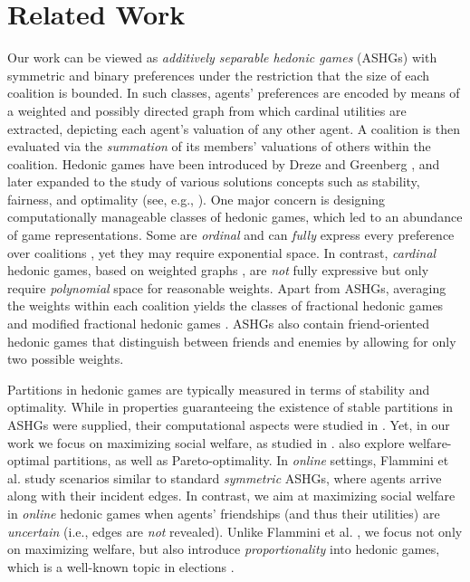 \documentclass[letterpaper]{article} %
\begin{document}
\section{Related Work}
Our work can be viewed as \textit{additively separable hedonic games} (ASHGs) \cite{bogomolnaia2002stability} with symmetric and binary preferences under the restriction that the size of each coalition is bounded. In such classes, agents' preferences are encoded by means of a weighted and possibly directed graph from which cardinal utilities are extracted, depicting each agent's valuation of any other agent. A coalition is then evaluated via the \textit{summation} of its members' valuations of others within the coalition. Hedonic games have been introduced by Dreze and Greenberg , and later expanded to the study of various solutions concepts such as stability, fairness, and optimality (see, e.g., \cite{aziz_savani_moulin_2016,woeginger2013core}). One major concern is designing computationally manageable classes of hedonic games, which led to an abundance of game representations. Some are \textit{ordinal} and can \textit{fully} express every preference over coalitions \cite{bouveret2010fair,elkind2009hedonic}, yet they may require exponential space. In contrast, \textit{cardinal} hedonic games, based on weighted graphs \cite{aziz2019fractional,bogomolnaia2002stability}, are \textit{not} fully expressive but only require \textit{polynomial} space for reasonable weights. Apart from ASHGs, averaging the weights within each coalition yields the classes of fractional hedonic games \cite{aziz2019fractional} and modified fractional hedonic games \cite{olsen2012defining}. ASHGs also contain friend-oriented hedonic games \cite{dimitrov2006simple} that distinguish between friends and enemies by allowing for only two possible weights. %
%

Partitions in hedonic games are typically measured in terms of stability and optimality. While in \cite{banerjee2001core,bogomolnaia2002stability} properties guaranteeing the existence of stable partitions in ASHGs were supplied, their computational aspects were studied in \cite{aziz2011stable,ballester2004np}. Yet, in our work we focus on maximizing social welfare, as studied in \cite{aziz2015welfare,monaco2020stable}. \cite{bullinger2020pareto,elkind2020price} also explore welfare-optimal partitions, as well as Pareto-optimality. In \textit{online} settings, Flammini et al.  study scenarios similar to standard \textit{symmetric} ASHGs, where agents arrive along with their incident edges. In contrast, we aim at maximizing social welfare in \textit{online} hedonic games when agents' friendships (and thus their utilities) are \textit{uncertain} (i.e., edges are \textit{not} revealed). Unlike Flammini et al. , we focus not only on maximizing welfare, but also introduce \textit{proportionality} into hedonic games, which is a well-known topic in elections \cite{lackner2023approval}. %
%
\end{document}

